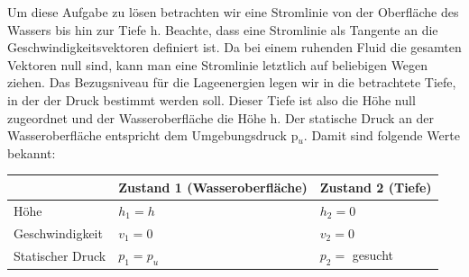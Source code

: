 \documentclass[a4paper,11pt]{article}
\newif\ifshowme
\begin{document}
Um diese Aufgabe zu lösen betrachten wir eine Stromlinie von der Oberfläche des Wassers bis hin zur Tiefe h. Beachte, dass eine Stromlinie als Tangente an die Geschwindigkeitsvektoren definiert ist. Da bei einem ruhenden Fluid die gesamten Vektoren null sind, kann man eine Stromlinie letztlich auf beliebigen Wegen ziehen. Das Bezugsniveau für die Lageenergien legen wir in die betrachtete Tiefe, in der der Druck bestimmt werden soll. Dieser Tiefe ist also die Höhe null zugeordnet und der Wasseroberfläche die Höhe h. Der statische Druck an der Wasseroberfläche entspricht dem Umgebungsdruck p$_u$. Damit sind folgende Werte bekannt:


\begin{table}[h]
\centering
\begin{tabular}{l|l|l}
& Zustand 1 (Wasseroberfläche) & Zustand 2 (Tiefe) \\ \hline
Höhe & $h_1 = h$ & $h_2 = 0$ \\ \hline
Geschwindigkeit & $v_1 = 0$ & $v_2 = 0$ \\ \hline
Statischer Druck & $p_1 = p_u $ & $p_2 =$ gesucht \\ \hline
\end{tabular}
\end{table}



\ifshowme
\antwort{
\begin{align*}
\underbrace{p_1}_{p_u} + \frac{1}{2} \rho \underbrace{v_1^2}_{=0} + \rho g \underbrace{h_1}_{=h} &= p_2 + \frac{1}{2} \rho \underbrace{v_2^2}_{=0} + \rho g \underbrace{h_2}_{=0} \\
p_2 &= p_u + \rho g h
\end{align*}
}
\else
\fi

\pagebreak
\end{document}
